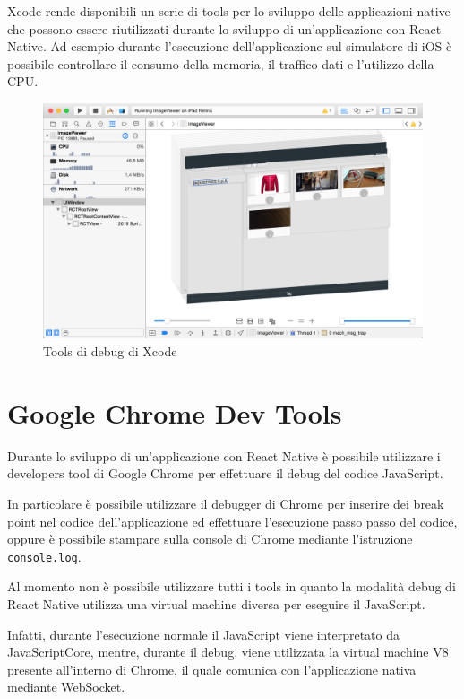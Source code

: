 Xcode rende disponibili un serie di tools per lo sviluppo delle applicazioni native che possono essere riutilizzati durante lo sviluppo di un'applicazione con React Native. Ad esempio durante l'esecuzione dell'applicazione sul simulatore di iOS è possibile controllare il consumo della memoria, il traffico dati e l'utilizzo della CPU.

\begin{figure}[htp]
\centering
\includegraphics[width=\textwidth]{../immagini/xcode-tools}
\caption{Tools di debug di Xcode}  
\end{figure}
\FloatBarrier

\section{Google Chrome Dev Tools}

Durante lo sviluppo di un'applicazione con React Native è possibile utilizzare i developers tool di Google Chrome per effettuare il debug del codice JavaScript.

In particolare è possibile utilizzare il debugger di Chrome per inserire dei break point nel codice dell'applicazione ed effettuare l'esecuzione passo passo del codice, oppure è possibile stampare sulla console di Chrome mediante l'istruzione \texttt{console.log}.

Al momento non è possibile utilizzare tutti i tools in quanto la modalità debug di React Native utilizza una virtual machine diversa per eseguire il JavaScript.

Infatti, durante l'esecuzione normale il JavaScript viene interpretato da JavaScriptCore, mentre, durante il debug, viene utilizzata la virtual machine V8 presente all'interno di Chrome, il quale comunica con l'applicazione nativa mediante WebSocket.

